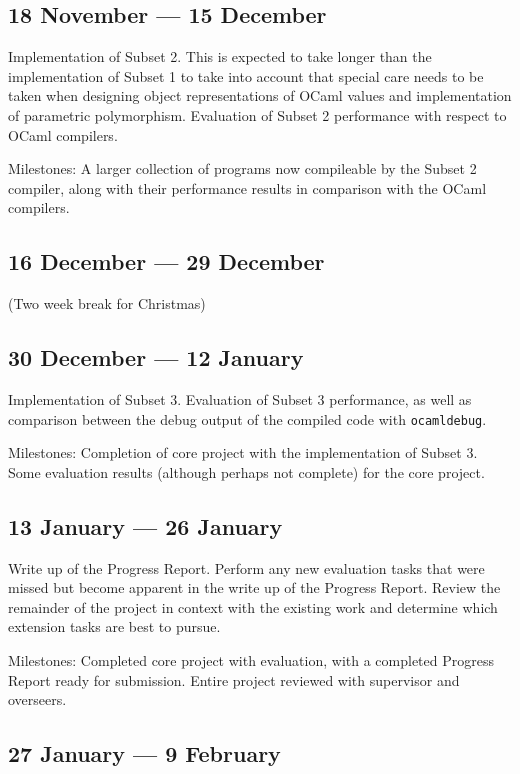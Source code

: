 \subsection*{18 November --- 15 December}

Implementation of Subset 2. This is expected to take longer than the
implementation of Subset 1 to take into account that special care needs to be
taken when designing object representations of OCaml values and implementation
of parametric polymorphism. Evaluation of Subset 2 performance with respect to
OCaml compilers.

Milestones: A larger collection of programs now compileable by the Subset 2
compiler, along with their performance results in comparison with the OCaml
compilers.

\subsection*{16 December --- 29 December}

(Two week break for Christmas)

\subsection*{30 December --- 12 January}

Implementation of Subset 3. Evaluation of Subset 3 performance, as well as
comparison between the debug output of the compiled code with
\texttt{ocamldebug}.

Milestones: Completion of core project with the implementation of Subset 3.
Some evaluation results (although perhaps not complete) for the core project.

\subsection*{13 January --- 26 January}

Write up of the Progress Report. Perform any new evaluation tasks that were
missed but become apparent in the write up of the Progress Report. Review the
remainder of the project in context with the existing work and determine which
extension tasks are best to pursue.

Milestones: Completed core project with evaluation, with a completed Progress
Report ready for submission. Entire project reviewed with supervisor and
overseers.

\subsection*{27 January --- 9 February}

